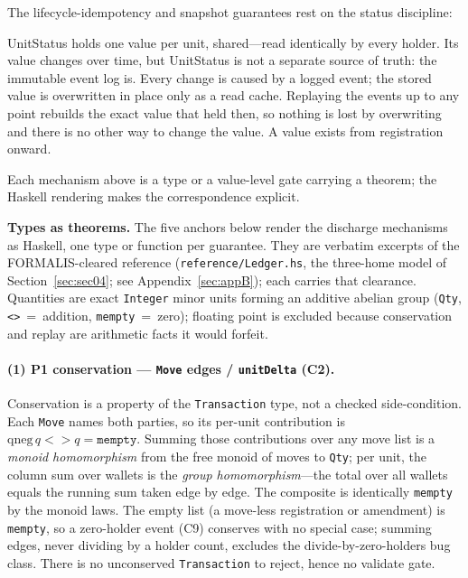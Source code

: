 The lifecycle-idempotency and snapshot guarantees rest on the status discipline:

\begin{remark}
UnitStatus holds one value per unit, shared---read identically by every holder. Its value changes over time, but UnitStatus is not a separate source of truth: the immutable event log is. Every change is caused by a logged event; the stored value is overwritten in place only as a read cache. Replaying the events up to any point rebuilds the exact value that held then, so nothing is lost by overwriting and there is no other way to change the value. A value exists from registration onward.
\end{remark}

Each mechanism above is a type or a value-level gate carrying a theorem; the Haskell rendering makes the correspondence explicit.

\noindent\textbf{Types as theorems.} The five anchors below render the discharge mechanisms as Haskell, one type or function per guarantee. They are verbatim excerpts of the FORMALIS-cleared reference (\texttt{reference/Ledger.hs}, the three-home model of Section~\ref{sec:sec04}; see Appendix~\ref{sec:appB}); each carries that clearance. Quantities are exact \texttt{Integer} minor units forming an additive abelian group (\texttt{Qty}, \texttt{<>}~=~addition, \texttt{mempty}~=~zero); floating point is excluded because conservation and replay are arithmetic facts it would forfeit.

\paragraph{(1) P1 conservation --- \texttt{Move} edges / \texttt{unitDelta} (C2).} Conservation is a property of the \texttt{Transaction} type, not a checked side-condition. Each \texttt{Move} names both parties, so its per-unit contribution is $\mathrm{qneg}\,q\mathbin{<\!\!>}q=\texttt{mempty}$. Summing those contributions over any move list is a \emph{monoid homomorphism} from the free monoid of moves to \texttt{Qty}; per unit, the column sum over wallets is the \emph{group homomorphism}---the total over all wallets equals the running sum taken edge by edge. The composite is identically \texttt{mempty} by the monoid laws. The empty list (a move-less registration or amendment) is \texttt{mempty}, so a zero-holder event (C9) conserves with no special case; summing edges, never dividing by a holder count, excludes the divide-by-zero-holders bug class. There is no unconserved \texttt{Transaction} to reject, hence no validate gate.

